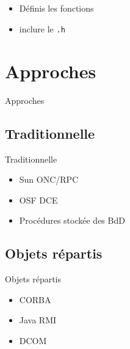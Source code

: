 \begin{frame}[containsverbatim]{\sectitle}
    \subsection{\subsectitle}
    \begin{block}{\subsectitle}
        \begin{itemize}
            \item Définis les fonctions
            \item inclure le \verb+.h+
        \end{itemize}
    \end{block}
\end{frame}


\def\sectitle{Approches}
\section{\sectitle}
\begin{frame}{\sectitle}
    \def\subsectitle{Traditionnelle}
    \subsection{\subsectitle}
    \begin{block}{\subsectitle}
        \begin{itemize}
            \item Sun ONC/RPC
            \item OSF DCE
            \item Procédures stockée des BdD
        \end{itemize}
    \end{block}
    \def\subsectitle{Objets répartis}
    \subsection{\subsectitle}
    \begin{block}{\subsectitle}
        \begin{itemize}
            \item  CORBA
            \item Java RMI 
            \item DCOM
        \end{itemize}
    \end{block}
\end{frame}

\def\sectitle{}
